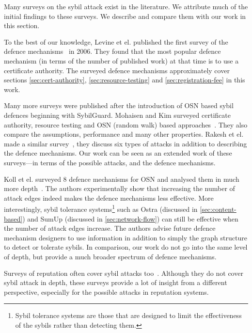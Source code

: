 Many surveys on the sybil attack exist in the literature. We attribute much of
the initial findings to these surveys. We describe and compare them with our
work in this section.

To the best of our knowledge, Levine et el. published the first survey of the
defence mechanisms~\cite{marti2006taxonomy} in 2006. They found that the most
popular defence mechanism (in terms of the number of published work) at that
time is to use a certificate authority. The surveyed defence mechanisms
approximately cover sections \ref{sec:cert-authority},
\ref{sec:resource-testing} and \ref{sec:registration-fee} in this work.

Many more surveys were published after the introduction of OSN based sybil
defences beginning with SybilGuard. Mohaisen and Kim surveyed certificate
authority, resource testing and OSN (random walk) based
approaches~\cite{mohaisen2013sybil}. They also compare the assumptions,
performance and many other properties. Rakesh et el. made a similar
survey~\cite{rakesh2014survey}, they discuss six types of attacks in addition to
describing the defence mechanisms. Our work can be seen as an extended work of
these surveys---in terms of the possible attacks, and the defence mechanisms.

Koll et el. surveyed 8 defence mechanisms for OSN and analysed them in much more
depth~\cite{koll2014state}. The authors experimentally show that increasing the
number of attack edges indeed makes the defence mechanisms less effective. More
interestingly, sybil tolerance systems\footnote{Sybil tolerance systems are
  those that are designed to limit the effectiveness of the sybils rather than
  detecting them.} such as Ostra (discussed in \autoref{sec:content-based}) and
SumUp (discussed in \autoref{sec:network-flow}) can still be effective when the
number of attack edges increase. The authors advise future defence mechanism
designers to use information in addition to simply the graph structure to detect
or tolerate sybils. In comparison, our work do not go into the same level of
depth, but provide a much broader spectrum of defence mechanisms.

Surveys of reputation often cover sybil attacks too~\cite{marti2006taxonomy,
  hoffman2009survey, koutrouli2012taxonomy, selvaraj2012survey}. Although they
do not cover sybil attack in depth, these surveys provide a lot of insight from
a different perspective, especially for the possible attacks in reputation
systems.

